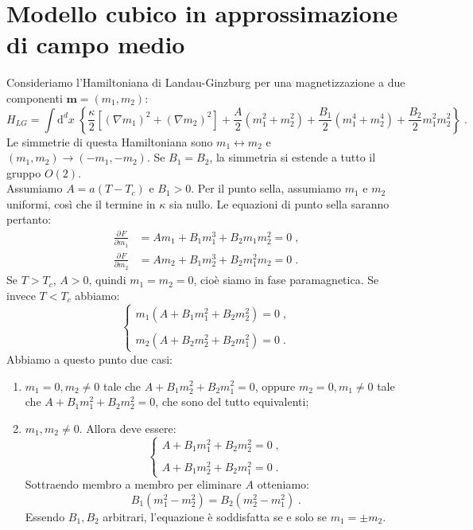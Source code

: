 \documentclass[10pt,a4paper]{report}
\theoremstyle{definition}
\newcommand{\pdev}[3][]{\frac{\partial^{#1} #2}{\partial #3^{#1}}}
\numberwithin{equation}{section}
\newcommand{\diff}[1][]{\mathrm{d}#1}
\begin{document}
\section{Modello cubico in approssimazione di campo medio}
Consideriamo l'Hamiltoniana di Landau-Ginzburg per una magnetizzazione a due componenti $\mathbf{m}=(m_1,m_2)$:
\begin{equation}
H_{LG}=\int\diff^d{x}\;\left\{\frac{\kappa}{2}\left[(\nabla m_1)^2+(\nabla m_2)^2\right]+\frac{A}{2}(m_1^2+m_2^2)+\frac{B_1}{2}(m_1^4+m_2^4)+\frac{B_2}{2}m_1^2m_2^2\right\}\;.
\end{equation}
Le simmetrie di questa Hamiltoniana sono $m_1\longleftrightarrow m_2$ e $(m_1,m_2)\to (-m_1,-m_2)$. Se $B_1=B_2$, la simmetria si estende a tutto il gruppo $O(2)$. \\
Assumiamo $A=a(T-T_c)$ e $B_1>0$. Per il punto sella, assumiamo $m_1$ e $m_2$ uniformi, così che il termine in $\kappa$ sia nullo. Le equazioni di punto sella saranno pertanto:
\begin{align}
\pdev{F}{m_1} &= Am_1+B_1m_1^3+B_2m_1m_2^2=0\;, \\
\pdev{F}{m_2} &= Am_2+B_1m_2^3+B_2m_1^2m_2=0\;.
\end{align}
Se $T>T_c$, $A>0$, quindi $m_1=m_2=0$, cioè siamo in fase paramagnetica. Se invece $T<T_c$ abbiamo:
\begin{equation}
\begin{cases}
m_1(A+B_1m_1^2+B_2m_2^2)=0\;, \\
\\
m_2(A+B_2m_2^2+B_2m_1^2)=0\;.
\end{cases}
\end{equation}
Abbiamo a questo punto due casi:
\begin{enumerate}
\item $m_1=0, m_2\ne 0$ tale che $A+B_1m_2^2+B_2m_1^2=0$, oppure $m_2=0,m_1\ne 0$ tale che $A+B_1m_1^2+B_2m_2^2=0$, che sono del tutto equivalenti;
\item $m_1,m_2\ne 0$. Allora deve essere:
\begin{equation}
\begin{cases}
A+B_1m_1^2+B_2m_2^2=0\;, \\
\\
A+B_1m_2^2+B_2m_1^2=0\;.
\end{cases}
\end{equation}
Sottraendo membro a membro per eliminare $A$ otteniamo:
\begin{equation}
B_1(m_1^2-m_2^2)=B_2(m_2^2-m_1^2)\;.
\end{equation}
Essendo $B_1,B_2$ arbitrari, l'equazione è soddisfatta se e solo se $m_1=\pm m_2$.
\end{enumerate}
\end{document}
